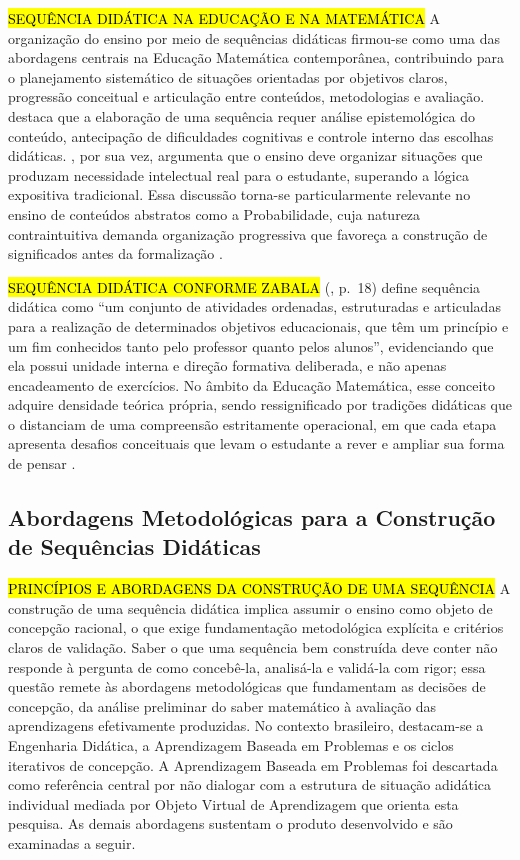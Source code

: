 {\hl{SEQUÊNCIA DIDÁTICA NA EDUCAÇÃO E NA MATEMÁTICA} A organização do ensino por meio de sequências didáticas firmou-se como uma das abordagens centrais na Educação Matemática contemporânea, contribuindo para o planejamento sistemático de situações orientadas por objetivos claros, progressão conceitual e articulação entre conteúdos, metodologias e avaliação.  destaca que a elaboração de uma sequência requer análise epistemológica do conteúdo, antecipação de dificuldades cognitivas e controle interno das escolhas didáticas. , por sua vez, argumenta que o ensino deve organizar situações que produzam necessidade intelectual real para o estudante, superando a lógica expositiva tradicional. Essa discussão torna-se particularmente relevante no ensino de conteúdos abstratos como a Probabilidade, cuja natureza contraintuitiva demanda organização progressiva que favoreça a construção de significados antes da formalização \cite[p.~9, 16, 23]{batanero2016}.

\hl{SEQUÊNCIA DIDÁTICA CONFORME ZABALA} \citeauthor{zabala1998} (\citeyear{zabala1998}, p.~18) define sequência didática como ``um conjunto de atividades ordenadas, estruturadas e articuladas para a realização de determinados objetivos educacionais, que têm um princípio e um fim conhecidos tanto pelo professor quanto pelos alunos'', evidenciando que ela possui unidade interna e direção formativa deliberada, e não apenas encadeamento de exercícios. No âmbito da Educação Matemática, esse conceito adquire densidade teórica própria, sendo ressignificado por tradições didáticas que o distanciam de uma compreensão estritamente operacional, em que cada etapa apresenta desafios conceituais que levam o estudante a rever e ampliar sua forma de pensar \cite[p.~66, 88]{brousseau2002}.

\subsection{Abordagens Metodológicas para a Construção de Sequências Didáticas}

\hl {PRINCÍPIOS E ABORDAGENS DA CONSTRUÇÃO DE UMA SEQUÊNCIA} A construção de uma sequência didática implica assumir o ensino como objeto de concepção racional, o que exige fundamentação metodológica explícita e critérios claros de validação. Saber o que uma sequência bem construída deve conter não responde à pergunta de como concebê-la, analisá-la e validá-la com rigor; essa questão remete às abordagens metodológicas que fundamentam as decisões de concepção, da análise preliminar do saber matemático à avaliação das aprendizagens efetivamente produzidas. No contexto brasileiro, destacam-se a Engenharia Didática, a Aprendizagem Baseada em Problemas e os ciclos iterativos de concepção. A Aprendizagem Baseada em Problemas \cite{viana2020abp} foi descartada como referência central por não dialogar com a estrutura de situação adidática individual mediada por Objeto Virtual de Aprendizagem que orienta esta pesquisa. As demais abordagens sustentam o produto desenvolvido e são examinadas a seguir.

}
